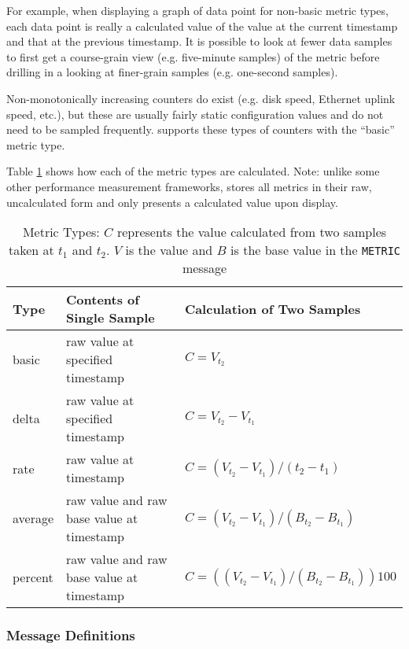 For example, when displaying a graph of data point for non-basic metric types, each data point is really a calculated
value of the value at the current timestamp and that at the previous timestamp. It is possible to look at fewer data
samples to first get a course-grain view (e.g. five-minute samples) of the metric before drilling in a looking at
finer-grain samples (e.g. one-second samples).

Non-monotonically increasing counters do exist (e.g. disk speed, Ethernet uplink speed, etc.), but these are usually
fairly static configuration values and do not need to be sampled frequently. \dcamp supports these types of counters
with the ``basic'' metric type.

Table \ref{tab:metric_types} shows how each of the \dcamp metric types are calculated. Note: unlike some other
performance measurement frameworks\cite{ganglia}, \dcamp stores all metrics in their raw, uncalculated form and only
presents a calculated value upon display.

\begin{table}
\begin{tabular}{|l|l|l|}
\hline
\textbf{Type} & \textbf{Contents of Single Sample} & \textbf{Calculation of Two Samples}
\\
\hline
basic & raw value at specified timestamp & \( C = V_{t_2} \)
\\
\hline
delta & raw value at specified timestamp & \( C = V_{t_2} - V_{t_1} \)
\\
\hline
rate & raw value at timestamp & \( C = (V_{t_2} - V_{t_1}) / (t_2 - t_1) \)
\\
\hline
average & raw value and raw base value at timestamp & \( C = (V_{t_2} - V_{t_1}) / (B_{t_2} - B_{t_1}) \)
\\
\hline
percent & raw value and raw base value at timestamp & \( C = ( (V_{t_2} - V_{t_1}) / (B_{t_2} - B_{t_1}) ) 100 \)
\\
\hline
\end{tabular}
\caption[Metric Types]
        {Metric Types: \(C\) represents the value calculated from two samples taken at \(t_1\) and \(t_2\). \(V\) is the
	 value and \(B\) is the base value in the \texttt{METRIC} message}
\label{tab:metric_types}
\end{table}

\subsubsection{Message Definitions}

